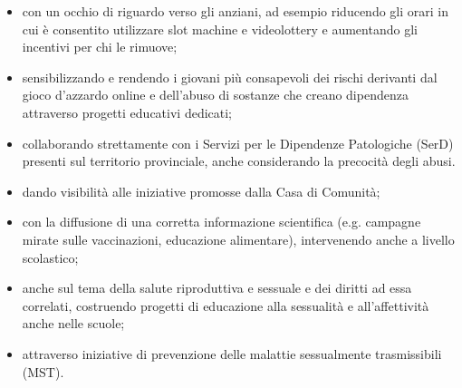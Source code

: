 \begin{itemize}
  \item con un occhio di riguardo verso gli anziani, ad esempio riducendo gli orari in cui è consentito utilizzare slot machine e videolottery e aumentando gli incentivi per chi le rimuove;
  \item sensibilizzando e rendendo i giovani più consapevoli dei rischi derivanti dal gioco d'azzardo online e dell'abuso di sostanze che creano dipendenza attraverso progetti educativi dedicati;
  \item collaborando strettamente con i Servizi per le Dipendenze Patologiche (SerD) presenti sul territorio provinciale, anche considerando la precocità degli abusi. 
\end{itemize}

\begin{itemize}
  \item dando visibilità alle iniziative promosse dalla Casa di Comunità;
  \item con la diffusione di una corretta informazione scientifica (e.g. campagne mirate sulle vaccinazioni, educazione alimentare), intervenendo anche a livello scolastico; 
  \item anche sul tema della salute riproduttiva e sessuale e dei diritti ad essa correlati, costruendo  progetti di educazione alla sessualità e all'affettività anche nelle scuole;
  \item attraverso iniziative di prevenzione delle malattie sessualmente trasmissibili (MST).
\end{itemize}
